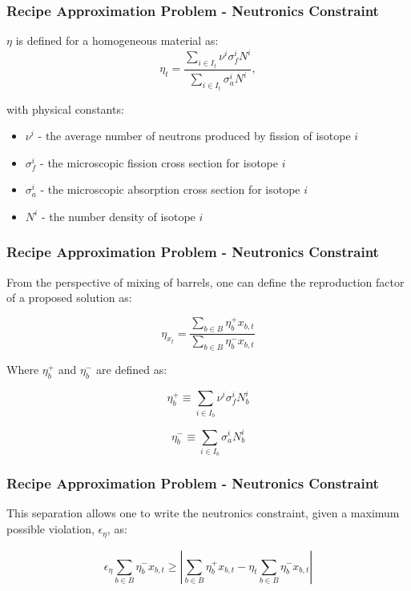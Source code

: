 \begin{frame}[ctb!]
  \frametitle{Recipe Approximation Problem - Neutronics Constraint}

  $\eta$ is defined for a homogeneous material as:
  \begin{equation}
    \label{eqs:eta_micro}
    \eta_{t} = \frac{\sum_{i \in I_t} \nu^{i} \sigma_{f}^{i} N^{i}} {\sum_{i
        \in I_t} \sigma_{a}^{i} N^{i}},
  \end{equation}

  with physical constants:
  \begin{itemize}
    \item $\nu^{i}$ - the average number of neutrons produced by fission of isotope $i$
    \item $\sigma_{f}^{i}$ - the microscopic fission cross section for isotope $i$
    \item $\sigma_{a}^{i}$ - the microscopic absorption cross section for isotope $i$
    \item $N^i$ - the number density of isotope $i$
  \end{itemize}
\end{frame}

\begin{frame}[ctb!]
  \frametitle{Recipe Approximation Problem - Neutronics Constraint}

  From the perspective of mixing of barrels, one can define the reproduction
  factor of a proposed solution as:

  \begin{equation}
    \label{eqs:eta_simple}
    \eta_{x_t} = \frac{\sum_{b \in B} \eta_{b}^{+} x_{b, t}}
        {\sum_{b \in B} \eta_{b}^{-} x_{b, t}}
  \end{equation}

  Where $\eta_b^+$ and $\eta_b^-$ are defined as:

  \begin{equation}
    \label{eqs:eta_+}
    \eta_{b}^{+} \equiv \sum_{i \in I_{b}} \nu^{i} \sigma_{f}^{i} N_{b}^{i}
  \end{equation}

  \begin{equation}
    \label{eqs:eta_-}
    \eta_{b}^{-} \equiv \sum_{i \in I_{b}} \sigma_{a}^{i} N_{b}^{i}
  \end{equation}
  
\end{frame}

\begin{frame}[ctb!]
  \frametitle{Recipe Approximation Problem - Neutronics Constraint} 

  This separation allows one to write the neutronics constraint, given a maximum
  possible violation, $\epsilon_{\eta}$, as:

  \begin{equation}
    \label{eqs:eta_linear}
    \epsilon_{\eta} \sum_{b \in B} \eta_{b}^{-} x_{b,t} \geq
    \left| \sum_{b \in B} \eta_{b}^{+} x_{b,t}
    - \eta_{t} \sum_{b \in B} \eta_{b}^{-} x_{b,t} \right|
  \end{equation}  
\end{frame}

